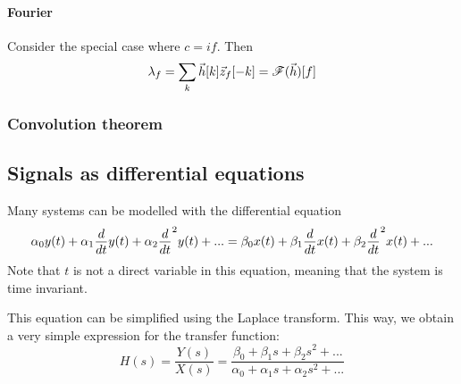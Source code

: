 \paragraph{Fourier} Consider the special case where $c = i f$. Then 
$$ \lambda_f = \sum_k \vec{h}[k] \vec{z}_f[-k] = \mathscr{F}(\vec{h})[f] $$


\subsubsection{Convolution theorem}

\subsection{Signals as differential equations}
Many systems can be modelled with the differential equation
$$ \alpha_0 y(t) + \alpha_1  \frac{ \mathop{d} }{ \mathop{dt} }  y(t) + \alpha_2  \frac{ \mathop{d} }{ \mathop{dt} } ^2 y(t) + ... =   \beta_0 x(t) + \beta_1  \frac{ \mathop{d} }{ \mathop{dt} }  x(t) + \beta_2  \frac{ \mathop{d} }{ \mathop{dt} } ^2 x(t) + ...   $$
Note that $t$ is not a direct variable in this equation, meaning that the system is time invariant. 

This equation can be simplified using the Laplace transform. 
This way, we obtain a very simple expression for the transfer function:
$$ H(s) = \frac{Y(s)}{X(s)} = \frac{\beta_0 + \beta_1 s + \beta_2 s^2 + ...}{\alpha_0 + \alpha_1 s + \alpha_2 s^2 + ...}  $$

